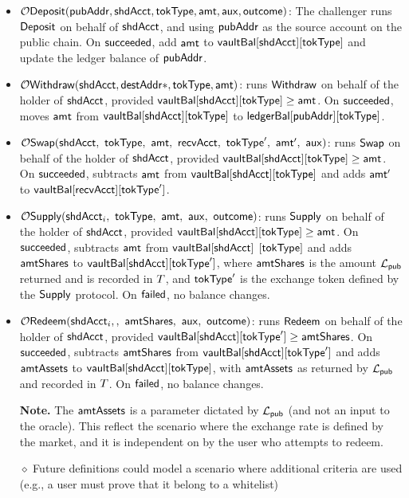 \begin{itemize}[leftmargin=1.4em,itemsep=3pt]
\item $\mathcal{O}\mathsf{Deposit}(\mathsf{pubAddr}, \mathsf{shdAcct}, \mathsf{tokType}, \mathsf{amt}, \mathsf{aux}, \mathsf{outcome})$:
The challenger runs $\mathsf{Deposit}$ on behalf of $\mathsf{shdAcct}$, and using  $\mathsf{pubAddr}$ as the source account on the public chain.
On $\mathsf{succeeded}$, add $\mathsf{amt}$ to $\mathsf{vaultBal}[\mathsf{shdAcct}][\mathsf{tokType}]$
and update the ledger balance of  $\mathsf{pubAddr}$.
\item $\mathcal{O}\mathsf{Withdraw}(\mathsf{shdAcct}, \mathsf{destAddr}*, \mathsf{tokType}, \mathsf{amt})$: runs $\mathsf{Withdraw}$ on behalf of
      the holder of $\mathsf{shdAcct}$, provided $\mathsf{vaultBal}[\mathsf{shdAcct}][\mathsf{tokType}] \ge \mathsf{amt}$. On $\mathsf{succeeded}$,
      moves $\mathsf{amt}$ from $\mathsf{vaultBal}[\mathsf{shdAcct}][\mathsf{tokType}]$ to $\mathsf{ledgerBal}[\mathsf{pubAddr}][\mathsf{tokType}]$.
\item $\OSw(\shdAcct\bc \tokType\bc \amt\bc \recvAcct\bc
      \tokTypeB\bc \amtB\bc \auxx)$: runs $\mathsf{Swap}$
      on behalf of the holder of $\mathsf{shdAcct}$, provided $\mathsf{vaultBal}[\mathsf{shdAcct}][\mathsf{tokType}] \ge \mathsf{amt}$. On
      $\mathsf{succeeded}$, subtracts $\mathsf{amt}$ from $\mathsf{vaultBal}[\mathsf{shdAcct}][\mathsf{tokType}]$ and adds $\mathsf{amt}'$ to
      $\mathsf{vaultBal}[\mathsf{recvAcct}][\mathsf{tokType}']$.
\item $\OSup(\shdAcct_i\bc \tokType\bc \amt\bc \auxx\bc \outc)$: runs $\mathsf{Supply}$ on behalf of the
      holder of $\mathsf{shdAcct}$, provided $\mathsf{vaultBal}[\mathsf{shdAcct}][\mathsf{tokType}] \ge \mathsf{amt}$. On $\mathsf{succeeded}$,
      subtracts $\mathsf{amt}$ from $\mathsf{vaultBal}[\mathsf{shdAcct}]$ $[\mathsf{tokType}]$ and adds $\mathsf{amtShares}$ to
      $\mathsf{vaultBal}[\mathsf{shdAcct}][\mathsf{tokType}']$, where $\mathsf{amtShares}$ is the amount $\mathcal{L}_{\mathsf{pub}}$ returned and is
      recorded in $T$, and $\mathsf{tokType}'$ is the exchange token
      defined by the $\mathsf{Supply}$ protocol. On $\mathsf{failed}$, no balance changes.
\item $\ORed(\shdAcct_i, \bc \amtShares\bc \auxx\bc \outc)$: runs $\mathsf{Redeem}$ on
      behalf of the holder of $\mathsf{shdAcct}$, provided
      $\mathsf{vaultBal}[\mathsf{shdAcct}][\mathsf{tokType}'] \ge \mathsf{amtShares}$. On $\mathsf{succeeded}$, subtracts $\mathsf{amtShares}$
      from $\mathsf{vaultBal}[\mathsf{shdAcct}][\mathsf{tokType}']$ and adds $\mathsf{amtAssets}$ to
      $\mathsf{vaultBal}[\mathsf{shdAcct}][\mathsf{tokType}]$, with $\mathsf{amtAssets}$ as returned by $\mathcal{L}_{\mathsf{pub}}$ and recorded in $T$.
      On $\mathsf{failed}$, no balance changes.

      \textbf{Note.} The $\mathsf{amtAssets}$ is a parameter dictated by $\mathcal{L}_{\mathsf{pub}}$ (and not an input to the oracle). This reflect the scenario where the exchange rate is defined by the market, and it is independent  on by the user who attempts to redeem.

      $\diamond$ Future  definitions could model a scenario where  additional criteria are used (e.g., a user must prove that it belong to a whitelist)
\end{itemize}

